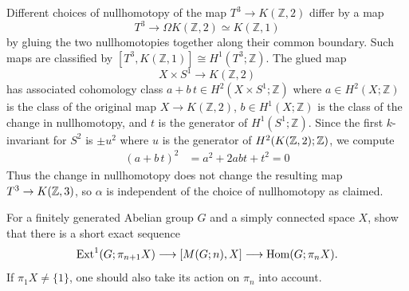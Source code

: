 \documentclass[12pt]{article}
\begin{document}
\begin{solution}
    Different choices of nullhomotopy of the map $T^3\to K(\mathbb Z,2)$ differ by a map \[T^3\to \Omega K(\mathbb Z,2)\simeq K(\mathbb Z,1)\] by gluing the two nullhomotopies together along their common boundary. Such maps are classified by $[T^3,K(\mathbb Z,1)]\cong H^1(T^3;\mathbb Z)$. The glued map
\[X\times S^1\to K(\mathbb Z,2)\]has associated cohomology class $a+b\,t\in H^2(X\times S^1;\mathbb Z)$ where $a\in H^2(X;\mathbb Z)$ is the class of the original map $X\to K(\mathbb Z,2)$, $b\in H^1(X;\mathbb Z)$ is the class of the change in nullhomotopy, and $t$ is the generator of $H^1(S^1;\mathbb Z)$. Since the first $k$-invariant for $S^2$ is $\pm u^2$ where $u$ is the generator of $H^2(K(\mathbb{Z},2);\mathbb{Z})$, we compute \begin{align*}
        (a+b\,t)^2&=a^2+2abt + t^2 = 0
    \end{align*}
Thus the change in nullhomotopy does not change the resulting map $T^3\to K(\mathbb{Z},3)$, so $\alpha$ is independent of the choice of nullhomotopy as claimed.
\end{solution}

\begin{problem}[2]
For a finitely generated Abelian group $G$ and a simply connected space $X$, show that there is a short exact sequence
\[
\operatorname{Ext}^1(G;\pi_{n+1}X)\longrightarrow [M(G;n),X]\longrightarrow \operatorname{Hom}(G;\pi_n X).
\]
If $\pi_1X\neq \{1\}$, one should also take its action on $\pi_n$ into account.
\end{problem}
\end{document}
